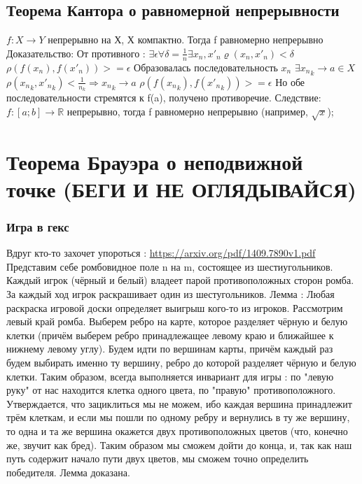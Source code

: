 \documentclass[12pt, a4paper]{article}
\newcommand{\nl}{\newline}
\begin{document}
\subsection{Теорема Кантора о равномерной непрерывности} 
    $f : X \rightarrow Y$ непрерывно на Х, Х компактно. \nl
    Тогда f равномерно непрерывно \nl
    Доказательство: \nl
    От противного : \nl
    $\exists \epsilon \forall \delta = \frac{1}{n} \exists x_n, {x'}_n \varrho(x_n, {x'}_n) < \delta$ \nl
    $\rho(f(x_n),f({x'}_n)) >= \epsilon$ \nl
    Образовалась последовательность $x_n$ \nl
    $\exists {x_n}_k \rightarrow a \in X$ \nl
    $\rho({x_n}_k, {{x'}_n}_k)<\frac{1}{{n_k}} \Rightarrow {x_n}_k \rightarrow a$ \nl
    $\rho(f({x_n}_k), f({{x'}_n}_k)) >= \epsilon$ \nl
    Но обе последовательности стремятся к f(a), получено противоречие. \nl
    Следствие: $f : [a; b] \rightarrow \mathbb{R}$ непрерывно, тогда f равномерно непрерывно (например, $\sqrt{x}$);
    
    \section{Теорема Брауэра о неподвижной точке (БЕГИ И НЕ ОГЛЯДЫВАЙСЯ)}
        \subsubsection{Игра в гекс}
        Вдруг кто-то захочет упороться : \url{https://arxiv.org/pdf/1409.7890v1.pdf} \nl
        Представим себе ромбовидное поле n на m, состоящее из шестиугольников. Каждый игрок (чёрный и белый) владеет парой противоположных сторон ромба. За каждый ход игрок раскрашивает один из шестугольников. \nl
        Лемма : Любая раскраска игровой доски определяет выигрыш кого-то из игроков. \nl
        Рассмотрим левый край ромба. Выберем ребро на карте, которое разделяет чёрную и белую клетки (причём выберем ребро принадлежащее левому краю и ближайшее к нижнему левому углу). Будем идти по вершинам карты, причём каждый раз будем выбирать именно ту вершину, ребро до которой разделяет чёрную и белую клетки. Таким образом, всегда выполняется инвариант для игры : по "левую руку" от нас находится клетка одного цвета, по "правую" противоположного. Утверждается, что зациклиться мы не можем, ибо каждая вершина принадлежит трём клеткам, и если мы пошли по одному ребру и вернулись в ту же вершину, то одна и та же вершина окажется двух противоположных цветов (что, конечно же, звучит как бред). Таким образом мы сможем дойти до конца, и, так как наш путь содержит начало пути двух цветов, мы сможем точно определить победителя. Лемма доказана. \nl
        
\end{document}
